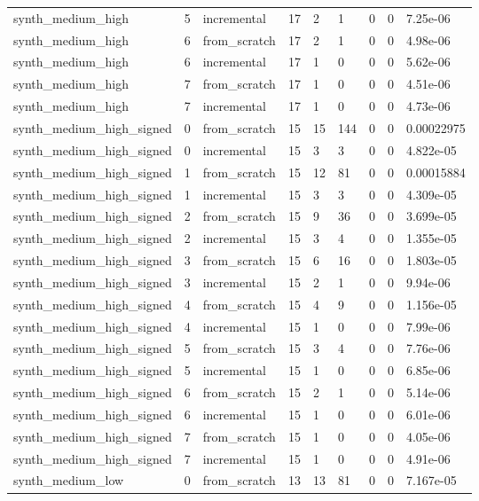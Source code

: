 \begin{table}[t]
\begin{tabular}{lllllllll}
synth\_medium\_high & 5 & incremental & 17 & 2 & 1 & 0 & 0 & 7.25e-06 \\
synth\_medium\_high & 6 & from\_scratch & 17 & 2 & 1 & 0 & 0 & 4.98e-06 \\
synth\_medium\_high & 6 & incremental & 17 & 1 & 0 & 0 & 0 & 5.62e-06 \\
synth\_medium\_high & 7 & from\_scratch & 17 & 1 & 0 & 0 & 0 & 4.51e-06 \\
synth\_medium\_high & 7 & incremental & 17 & 1 & 0 & 0 & 0 & 4.73e-06 \\
synth\_medium\_high\_signed & 0 & from\_scratch & 15 & 15 & 144 & 0 & 0 & 0.00022975 \\
synth\_medium\_high\_signed & 0 & incremental & 15 & 3 & 3 & 0 & 0 & 4.822e-05 \\
synth\_medium\_high\_signed & 1 & from\_scratch & 15 & 12 & 81 & 0 & 0 & 0.00015884 \\
synth\_medium\_high\_signed & 1 & incremental & 15 & 3 & 3 & 0 & 0 & 4.309e-05 \\
synth\_medium\_high\_signed & 2 & from\_scratch & 15 & 9 & 36 & 0 & 0 & 3.699e-05 \\
synth\_medium\_high\_signed & 2 & incremental & 15 & 3 & 4 & 0 & 0 & 1.355e-05 \\
synth\_medium\_high\_signed & 3 & from\_scratch & 15 & 6 & 16 & 0 & 0 & 1.803e-05 \\
synth\_medium\_high\_signed & 3 & incremental & 15 & 2 & 1 & 0 & 0 & 9.94e-06 \\
synth\_medium\_high\_signed & 4 & from\_scratch & 15 & 4 & 9 & 0 & 0 & 1.156e-05 \\
synth\_medium\_high\_signed & 4 & incremental & 15 & 1 & 0 & 0 & 0 & 7.99e-06 \\
synth\_medium\_high\_signed & 5 & from\_scratch & 15 & 3 & 4 & 0 & 0 & 7.76e-06 \\
synth\_medium\_high\_signed & 5 & incremental & 15 & 1 & 0 & 0 & 0 & 6.85e-06 \\
synth\_medium\_high\_signed & 6 & from\_scratch & 15 & 2 & 1 & 0 & 0 & 5.14e-06 \\
synth\_medium\_high\_signed & 6 & incremental & 15 & 1 & 0 & 0 & 0 & 6.01e-06 \\
synth\_medium\_high\_signed & 7 & from\_scratch & 15 & 1 & 0 & 0 & 0 & 4.05e-06 \\
synth\_medium\_high\_signed & 7 & incremental & 15 & 1 & 0 & 0 & 0 & 4.91e-06 \\
synth\_medium\_low & 0 & from\_scratch & 13 & 13 & 81 & 0 & 0 & 7.167e-05 \\

\end{tabular}
\end{table}
